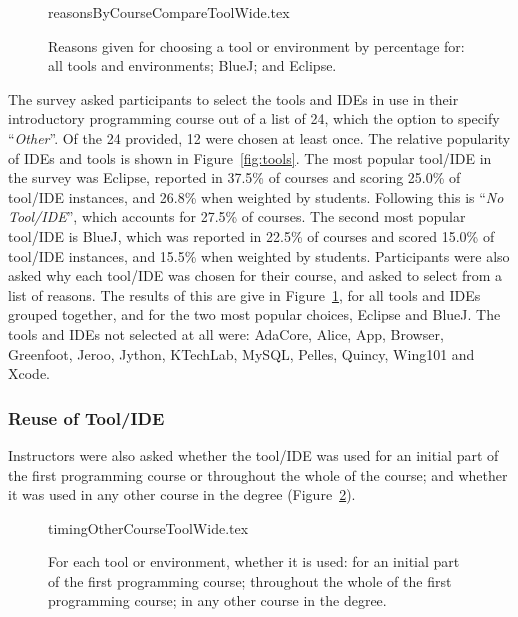 \documentclass[a4paper,11pt]{article}
\begin{document}
\begin{figure}[ht]
\begin{center}
{reasonsByCourseCompareToolWide.tex}
\end{center}
\caption{Reasons given for choosing a tool or environment by percentage for: all tools and environments; BlueJ; and Eclipse.\label{fig:reasonsTools}}
\end{figure}

The survey asked participants to select the tools and IDEs in use in
their introductory programming course out of a list of 24, which the
option to specify ``{\emph{Other}}''. Of the 24 provided, 12 were
chosen at least once. The relative popularity of IDEs and tools is
shown in Figure~\ref{fig:tools}. The most popular tool/IDE in the
survey was Eclipse, reported in 37.5\% of courses and scoring 25.0\%
of tool/IDE instances, and 26.8\% when weighted by students. Following
this is ``{\emph{No Tool/IDE}}'', which accounts for 27.5\% of
courses. The second most popular tool/IDE is BlueJ, which was reported
in 22.5\% of courses and scored 15.0\% of tool/IDE instances, and
15.5\% when weighted by students. Participants were also asked why
each tool/IDE was chosen for their course, and asked to select from a
list of reasons. The results of this are give in
Figure~\ref{fig:reasonsTools}, for all tools and IDEs grouped
together, and for the two most popular choices, Eclipse and BlueJ. The
tools and IDEs not selected at all were: AdaCore, Alice, App, Browser,
Greenfoot, Jeroo, Jython, KTechLab, MySQL, Pelles, Quincy, Wing101 and
Xcode.

\subsubsection{Reuse of Tool/IDE}

Instructors were also asked whether the tool/IDE was used for an
initial part of the first programming course or throughout the whole
of the course; and whether it was used in any other course in the
degree (Figure~\ref{fig:toolreuse}). 

\begin{figure}[ht]
\begin{center}
{timingOtherCourseToolWide.tex}
\end{center}
\caption{For each tool or environment, whether it is used: for an initial part of the first programming course; throughout the whole of the first programming course; in any other course in the degree.\label{fig:toolreuse}}
\end{figure}
\end{document}
